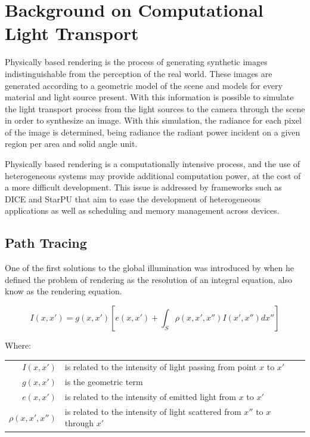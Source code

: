 \chapter{Background on Computational Light Transport}

Physically based rendering is the process of generating synthetic images indistinguishable from the perception of the real world. These images are generated according to a geometric model of the scene and models for every material and light source present. With this information is possible to simulate the light transport process from the light sources to the camera through the scene in order to synthesize an image. With this simulation, the radiance for each pixel of the image is determined, being radiance the radiant power incident on a given region per area and solid angle unit.

Physically based rendering is a computationally intensive process, and the use of heterogeneous systems may provide additional computation power, at the cost of a more difficult development. This issue is addressed by frameworks such as DICE \citep{Barbosa} and StarPU \citep{augonnet2011starpu} that aim to ease the development of heterogeneous applications as well as scheduling and memory management across devices.

\section{Path Tracing}

One of the first solutions to the global illumination was introduced by \cite{Kajiya} when he defined the problem of rendering as the resolution of an integral equation, also know as the rendering equation.

\begin{equation}
I(x,x')=g(x,x')\left[e(x,x')+\int_{S}^{} \rho(x,x',x'')I(x',x'')dx''\right]
\label{eq:render_eq}
\end{equation}

Where:

\begin{tabular}{r l}
$I(x,x')$ & is related to the intensity of light passing from point $x$ to $x'$ \\
$g(x,x')$ & is the geometric term \\
$e(x,x')$ & is related to the intensity of emitted light from $x$ to $x'$ \\
$\rho(x,x',x'')$ & is related to the intensity of light scattered from $x''$ to $x$ through $x'$\\
\end{tabular}
\\

